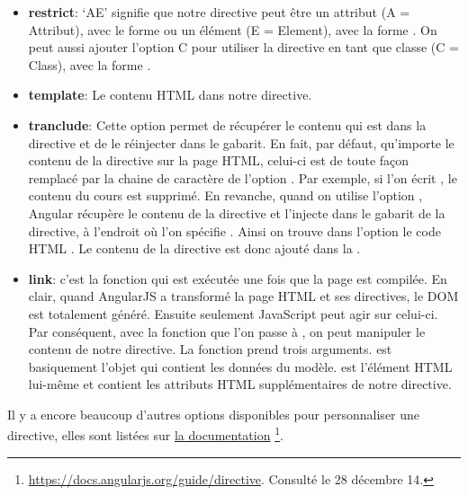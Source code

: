 \documentclass[a4paper,10pt,twoside]{sphinxmanual}
\begin{document}
\begin{itemize}
\item {} 
\textbf{restrict}: `AE' signifie que notre directive peut être un attribut (A = Attribut), avec le forme  ou un élément (E = Element), avec la forme . On peut aussi ajouter l'option C pour utiliser la directive en tant que classe (C = Class), avec la forme .

\item {} 
\textbf{template}: Le contenu HTML dans notre directive.

\item {} 
\textbf{tranclude}: Cette option permet de récupérer le contenu qui est dans la directive et de le réinjecter dans le gabarit. En fait, par défaut, qu'importe le contenu de la directive sur la page HTML, celui-ci est de toute façon remplacé par la chaine de caractère de l'option . Par exemple, si l'on écrit , le contenu du cours est supprimé. En revanche, quand on utilise l'option , Angular récupère le contenu de la directive et l'injecte dans le gabarit de la directive, à l'endroit où l'on spécifie . Ainsi on trouve dans l'option  le code HTML . Le contenu de la directive est donc ajouté dans la .

\item {} 
\textbf{link}: c'est la fonction qui est exécutée une fois que la page est compilée. En clair, quand AngularJS a transformé la page HTML et ses directives, le DOM est totalement généré. Ensuite seulement JavaScript peut agir sur celui-ci. Par conséquent, avec la fonction que l'on passe à , on peut manipuler le contenu de notre directive. La fonction prend trois arguments.  est basiquement l'objet qui contient les données du modèle.  est l'élément HTML lui-même et  contient les attributs HTML supplémentaires de notre directive.

\end{itemize}

Il y a encore beaucoup d'autres options disponibles pour personnaliser une directive, elles sont listées sur \href{https://docs.angularjs.org/guide/directive}{la documentation} \footnote{
\href{https://docs.angularjs.org/guide/directive}{https://docs.angularjs.org/guide/directive}. Consulté le 28 décembre 14.
}.
\end{document}
